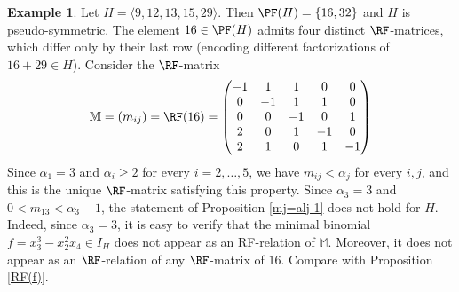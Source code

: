 \documentclass[11pt,twoside]{amsart}
\def\bbM{{\mathbb M}}
\theoremstyle{definition}
\newtheorem{ex}[Theorem]{Example}
\numberwithin{equation}{section}
\begin{document}
\begin{ex}\label{ce_RF(f)} 
Let $H = \langle 9,12,13,15,29\rangle$. 
Then $\PF(H) =\{16,32\}$ and  $H$ is pseudo-symmetric. 
The element $16 \in \PF(H)$ admits four distinct $\RF$-matrices, which differ only by their last row (encoding different factorizations of $16+29 \in H$).
Consider  the $\RF$-matrix
\[ \bbM=(m_{ij})=\RF(16)=\begin{pmatrix} -1 & 1 & 1 & 0 & 0 \\
                            0 & -1& 1 & 1 & 0 \\    
                            0 &  0& -1& 0 & 1 \\
                            2 &  0&  1& -1& 0 \\
                            2 &  1 &  0 &  1 & -1       
\end{pmatrix}
\]
Since $\alpha_1=3$ and $\alpha_i \ge 2$ for every $i=2,\ldots,5$, we have  $m_{ij} < \alpha_j$ for every $i,j$, and this is the unique $\RF$-matrix satisfying this property.
Since $\alpha_3=3$ and $0 < m_{13} < \alpha_3-1$, the statement of Proposition \ref{mj=alj-1} does not hold for $H$. 
Indeed, since $\alpha_3=3$, it is easy to verify that the minimal binomial $f=x_3^3- x_2^2x_4\in I_H$ does not appear as an RF-relation of $\bbM$. Moreover, it does not appear as an $\RF$-relation of any $\RF$-matrix of $16$.
Compare with Proposition \ref{RF(f)}.
\end{ex}
\end{document}
